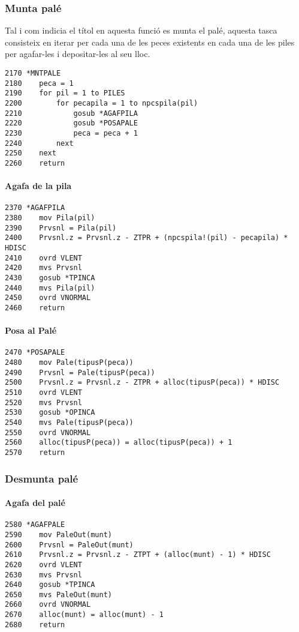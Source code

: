 \subsubsection{Munta palé}
Tal i com indicia el títol en aquesta funció es munta el palé, aquesta tasca consisteix en iterar
per cada una de les peces existents en cada una de les piles per agafar-les i depositar-les al seu lloc.

\begin{verbatim}
2170 *MNTPALE
2180    peca = 1
2190    for pil = 1 to PILES 
2200        for pecapila = 1 to npcspila(pil)
2210            gosub *AGAFPILA
2220            gosub *POSAPALE
2230            peca = peca + 1
2240        next
2250    next
2260    return
\end{verbatim}

\paragraph{Agafa de la pila}
\begin{verbatim}
2370 *AGAFPILA
2380    mov Pila(pil)
2390    Prvsnl = Pila(pil)
2400    Prvsnl.z = Prvsnl.z - ZTPR + (npcspila!(pil) - pecapila) * HDISC
2410    ovrd VLENT
2420    mvs Prvsnl
2430    gosub *TPINCA
2440    mvs Pila(pil)
2450    ovrd VNORMAL
2460    return
\end{verbatim}


\paragraph{Posa al Palé}
\begin{verbatim}
2470 *POSAPALE
2480    mov Pale(tipusP(peca))
2490    Prvsnl = Pale(tipusP(peca))
2500    Prvsnl.z = Prvsnl.z - ZTPR + alloc(tipusP(peca)) * HDISC
2510    ovrd VLENT
2520    mvs Prvsnl
2530    gosub *OPINCA
2540    mvs Pale(tipusP(peca))
2550    ovrd VNORMAL
2560    alloc(tipusP(peca)) = alloc(tipusP(peca)) + 1
2570    return
\end{verbatim}

\subsubsection{Desmunta palé}
\paragraph{Agafa del palé}
\begin{verbatim}
2580 *AGAFPALE
2590    mov PaleOut(munt)
2600    Prvsnl = PaleOut(munt)
2610    Prvsnl.z = Prvsnl.z - ZTPT + (alloc(munt) - 1) * HDISC
2620    ovrd VLENT
2630    mvs Prvsnl
2640    gosub *TPINCA
2650    mvs PaleOut(munt)
2660    ovrd VNORMAL
2670    alloc(munt) = alloc(munt) - 1
2680    return
\end{verbatim}


